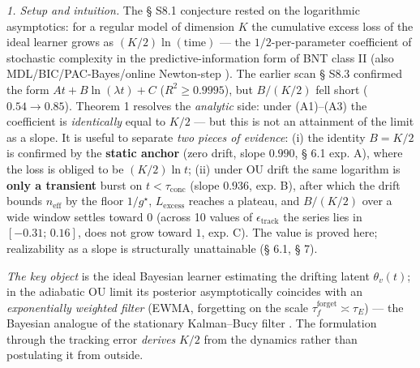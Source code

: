 \documentclass[12pt]{iopart}
\begin{document}
\emph{1. Setup and intuition.} The § S8.1 conjecture \cite{Andriishin2026b} rested on the logarithmic asymptotics: for a regular model of dimension \(K\) the cumulative excess loss of the ideal learner grows as \((K/2)\ln(\text{time})\) --- the \(1/2\)-per-parameter coefficient of stochastic complexity \cite{Rissanen1986,ClarkeBarron1990,Schwarz1978} in the predictive-information form of BNT class II \cite{BialekNemenmanTishby2001} (also MDL/BIC/PAC-Bayes/online Newton-step \cite{Schwarz1978,McAllester1999,Hazan2007}). The earlier scan \cite{Andriishin2026b} § S8.3 confirmed the form \(A t + B\ln(\lambda t) + C\) (\(R^2 \ge 0.9995\)), but \(B/(K/2)\) fell short (\(0.54 \to 0.85\)). Theorem 1 resolves the \emph{analytic} side: under (A1)--(A3) the coefficient is \emph{identically} equal to \(K/2\) --- but this is not an attainment of the limit as a slope. It is useful to separate \emph{two pieces of evidence}: (i) the identity \(B = K/2\) is confirmed by the \textbf{static anchor} (zero drift, slope \(0.990\), § 6.1 exp. A), where the loss is obliged to be \((K/2)\ln t\); (ii) under OU drift the same logarithm is \textbf{only a transient} burst on \(t < \tau_{\text{conc}}\) (slope \(0.936\), exp. B), after which the drift bounds \(n_{\text{eff}}\) by the floor \(1/g^\star\), \(L_{\text{excess}}\) reaches a plateau, and \(B/(K/2)\) over a wide window settles toward \(0\) (across 10 values of \(\epsilon_{\text{track}}\) the series lies in \([-0.31;\,0.16]\), does not grow toward \(1\), exp. C). The value is proved here; realizability as a slope is structurally unattainable (§ 6.1, § 7).



\emph{The key object} is the ideal Bayesian learner estimating the drifting latent \(\theta_v(t)\); in the adiabatic OU limit its posterior asymptotically coincides with an \emph{exponentially weighted filter} (EWMA, forgetting on the scale \(\tau_f^{\text{forget}} \asymp \tau_E\)) --- the Bayesian analogue of the stationary Kalman--Bucy filter \cite{KalmanBucy1961,AndersonMoore1979}. The formulation through the tracking error \emph{derives} \(K/2\) from the dynamics rather than postulating it from outside.
\end{document}
